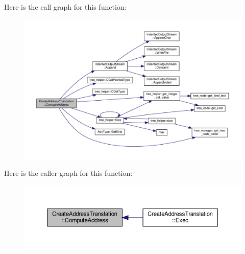 Here is the call graph for this function\+:
\nopagebreak
\begin{figure}[H]
\begin{center}
\leavevmode
\includegraphics[width=350pt]{d1/d40/classCreateAddressTranslation_ae9d301ed54d571ed497d2542988d57bc_cgraph}
\end{center}
\end{figure}
Here is the caller graph for this function\+:
\nopagebreak
\begin{figure}[H]
\begin{center}
\leavevmode
\includegraphics[width=350pt]{d1/d40/classCreateAddressTranslation_ae9d301ed54d571ed497d2542988d57bc_icgraph}
\end{center}
\end{figure}
\mbox{\label{classCreateAddressTranslation_a3cabbb27cb880dfeb1c20aec7ada4a58}} 
